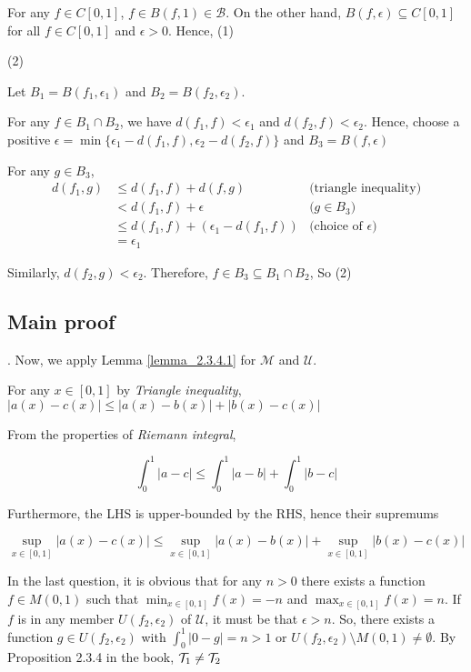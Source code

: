 \documentclass{article}
\begin{document}
For any $f \in C[0, 1]$, $f \in B(f, 1) \in \mathcal{B}$. On the other hand, $B(f, \epsilon) \subseteq C[0, 1]$ for all $f \in C[0, 1]$ and $\epsilon > 0$. Hence, (1)

(2)

Let $B_1 = B(f_1, \epsilon_1)$ and $B_2 = B(f_2, \epsilon_2)$.

For any $f \in B_1 \cap B_2$, we have $d(f_1, f) < \epsilon_1$ and $d(f_2, f) < \epsilon_2$. Hence, choose a positive $\epsilon = \min \{\epsilon_1 - d(f_1, f), \epsilon_2 - d(f_2, f)\}$ and $B_3 = B(f, \epsilon)$

For any $g \in B_3$,
\begin{align*}
    d(f_1, g)   &\leq d(f_1, f) + d(f, g) &\text{(triangle inequality)} \\
                &< d(f_1, f) + \epsilon &\text{($g \in B_3$)} \\
                &\leq d(f_1, f) + (\epsilon_1 - d(f_1, f)) &\text{(choice of $\epsilon$)} \\
                &= \epsilon_1
\end{align*}

Similarly, $d(f_2, g) < \epsilon_2$. Therefore, $f \in B_3 \subseteq B_1 \cap B_2$, So (2)

\subsection*{Main proof} .
Now, we apply Lemma \ref{lemma_2.3.4.1} for $\mathcal{M}$ and $\mathcal{U}$.
 
For any $x \in [0, 1]$ by \emph{Triangle inequality}, $|a(x) - c(x)| \leq |a(x) - b(x)| + |b(x) - c(x)|$


From the properties of \emph{Riemann integral},

$$
    \int_0^1 |a - c| \leq \int_0^1 |a - b| + \int_0^1 |b - c|
$$

Furthermore, the LHS is upper-bounded by the RHS, hence their supremums

$$
    \sup_{x \in [0, 1]} |a(x) - c(x)| \leq \sup_{x \in [0, 1]} |a(x) - b(x)| + \sup_{x \in [0, 1]} |b(x) - c(x)|
$$

In the last question, it is obvious that for any $n > 0$ there exists a function $f \in M(0, 1)$ such that $\min_{x \in [0, 1]} f(x) = -n$ and $\max_{x \in [0, 1]} f(x) = n$. If $f$ is in any member $U(f_2, \epsilon_2)$ of $\mathcal{U}$, it must be that $\epsilon > n$. So, there exists a function $g \in U(f_2, \epsilon_2)$ with $\int_0^1 |0 -g| = n > 1$ or $U(f_2, \epsilon_2) \setminus M(0, 1) \neq \emptyset$. By Proposition 2.3.4 in the book, $\mathcal{T}_1 \neq \mathcal{T}_2$
\end{document}
